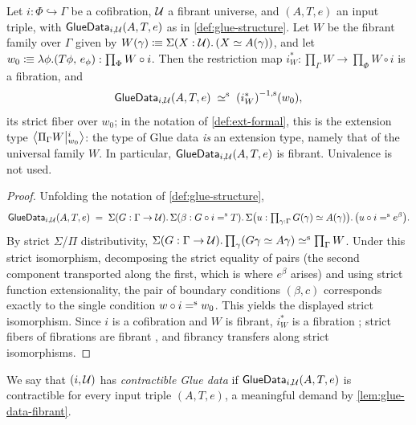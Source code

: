 \begin{lemma}\label{lem:glue-data-fibrant}
	Let $i:\Phi\hookrightarrow\Gamma$ be a cofibration, $\UU$ a fibrant
	universe, and $(A,T,e)$ an input triple, with
	$\mathsf{GlueData}_{i,\UU}(A,T,e)$ as in \cref{def:glue-structure}. Let $W$
	be the fibrant family
	over $\Gamma$ given by $W(\gamma)\colonequiv\Sigma(X:\UU).\,(X\simeq A(\gamma))$,
	and let $w_0\colonequiv\lambda\phi.(T\phi,\,e_\phi):\prod_\Phi W\circ i$.
	Then the restriction map $i^*_W:\prod_\Gamma W\to\prod_\Phi W\circ i$ is a
	fibration, and
	\[
		\mathsf{GlueData}_{i,\UU}(A,T,e)\;\siso\; \sfib{(i^*_W)}(w_0),
	\]
	its strict fiber over $w_0$; in the notation of \cref{def:ext-formal},
	this is the extension type $\Ext{i}{\Pi_\Gamma W}{w_0}$: the type of Glue data \emph{is}
	an extension type, namely that of the universal family $W$. In particular,
	$\mathsf{GlueData}_{i,\UU}(A,T,e)$ is fibrant. Univalence is not used.
\end{lemma}
\begin{proof}
	Unfolding the notation of \cref{def:glue-structure},
	\[
		\mathsf{GlueData}_{i,\UU}(A,T,e)
		\;=\;
		\Sigma(G:\Gamma\to\UU).\,
		\Sigma(\beta:G\circ i\seq T).\,
		\Sigma\bigl(u:\textstyle\prod_{\gamma:\Gamma}G(\gamma)\simeq A(\gamma)\bigr).\,
		\bigl(u\circ i\seq e^\beta\bigr).
	\]
	By strict $\Sigma$/$\Pi$ distributivity,
	$\Sigma(G:\Gamma\to\UU).\prod_\gamma(G\gamma\simeq A\gamma)\siso\prod_\Gamma W$. Under
	this strict isomorphism, decomposing the strict equality of pairs (the
	second component transported along the first, which is where $e^\beta$
	arises) and using strict function extensionality, the pair of boundary
	conditions $(\beta,c)$ corresponds exactly to the single condition
	$w\circ i\seq w_0$. This yields the displayed strict isomorphism. Since $i$
	is a cofibration and $W$ is fibrant, $i^*_W$ is a fibration
	\citep[Lem.~3.18]{2LTT}; strict fibers of fibrations are fibrant
	\citep[Lem.~3.9]{2LTT}, and fibrancy transfers along strict isomorphisms.
\end{proof}

\begin{definition}\label{def:strong-glue}
	We say that $(i,\UU)$ has \emph{contractible Glue data} if
	$\mathsf{GlueData}_{i,\UU}(A,T,e)$ is contractible for every input triple
	$(A,T,e)$, a meaningful demand by \cref{lem:glue-data-fibrant}.
\end{definition}

